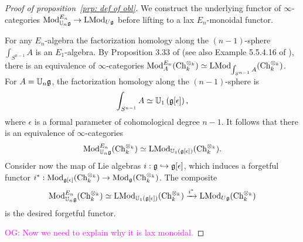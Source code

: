 \documentclass[11pt]{amsart}
\numberwithin{equation}{section}
\def\owen{\textcolor{magenta}{OG: }\textcolor{magenta}}
\begin{document}
\begin{proof}[Proof of proposition~\ref{prp: def of obl}]
We construct the underlying functor of $\infty$-categories ${\rm Mod}^{E_n}_{\mathbb U_n \mathfrak g} \to {\rm LMod}_{U\mathfrak g}$ 
before lifting to a lax $E_n$-monoidal functor.

For any $E_n$-algebra the factorization homology along the $(n-1)$-sphere $\int_{S^{n-1}} A$ is an $E_1$-algebra.
By Proposition 3.33 of \cite{FrancisHH} (see also Example 5.5.4.16 of \cite{LurieHA}), 
there is an equivalence of $\infty$-categories ${\rm Mod}^{E_n}_A ({\rm Ch}_k^{\otimes_k}) \simeq {\rm LMod}_{\int_{S^{n-1}} A} ({\rm Ch}_k^{\otimes_k})$.
For $A = \mathbb U_n \mathfrak g$, the factorization homology along the $(n-1)$-sphere is 
\[
\int_{S^{n-1}} A \simeq \mathbb U_1 \left(\mathfrak g[\epsilon] \right),
\] 
where $\epsilon$ is a formal parameter of cohomological degree $n-1$.
It follows that there is an equivalence of $\infty$-categories 
\[
{\rm Mod}_{\mathbb U_n \mathfrak g}^{E_n} ({\rm Ch}_k^{\otimes_k}) \simeq {\rm LMod}_{\mathbb U_1(\mathfrak g[\epsilon])} ({\rm Ch}_k^{\otimes_k}).
\]
Consider now the map of Lie algebras $i : \mathfrak g \hookrightarrow \mathfrak g[\epsilon]$,
which induces a forgetful functor $i^* :  {\rm Mod}_{\mathfrak g[\epsilon]} ({\rm Ch}_k^{\otimes_k})  \to  {\rm Mod}_{\mathfrak g} ({\rm Ch}_k^{\otimes_k})$. 
The composite 
\[
{\rm Mod}_{\mathbb U_n \mathfrak g}^{E_n} ({\rm Ch}_k^{\otimes_k}) \simeq {\rm LMod}_{\mathbb U_1(\mathfrak g[\epsilon])} ({\rm Ch}_k^{\otimes_k}) \xrightarrow{i^*}  {\rm LMod}_{U\mathfrak g} ({\rm Ch}_k^{\otimes_k})
\]
is the desired forgetful functor.

\owen{Now we need to explain why it is lax monoidal.}
\end{proof}
\end{document}
